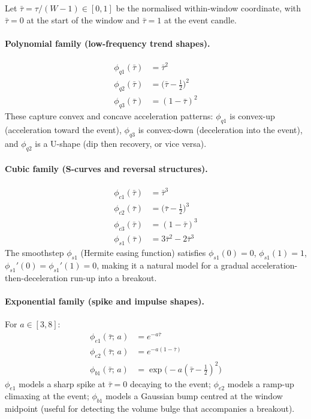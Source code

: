 \documentclass[11pt,a4paper]{article}
\theoremstyle{definition}
\theoremstyle{plain}
\begin{document}
Let $\bar{\tau} = \tau / (W - 1) \in [0, 1]$ be the normalised within-window coordinate,
with $\bar{\tau} = 0$ at the start of the window and $\bar{\tau} = 1$ at the event
candle.

\paragraph{Polynomial family (low-frequency trend shapes).}
\begin{align}
    \phi_{q1}(\bar{\tau}) &= \bar{\tau}^2
        \label{eq:phi_q1} \\
    \phi_{q2}(\bar{\tau}) &= \bigl(\bar{\tau} - \tfrac{1}{2}\bigr)^2
        \label{eq:phi_q2} \\
    \phi_{q3}(\bar{\tau}) &= (1 - \bar{\tau})^2
        \label{eq:phi_q3}
\end{align}
These capture convex and concave acceleration patterns: $\phi_{q1}$ is convex-up
(acceleration toward the event), $\phi_{q3}$ is convex-down (deceleration into the
event), and $\phi_{q2}$ is a U-shape (dip then recovery, or vice versa).

\paragraph{Cubic family (S-curves and reversal structures).}
\begin{align}
    \phi_{c1}(\bar{\tau}) &= \bar{\tau}^3
        \label{eq:phi_c1} \\
    \phi_{c2}(\bar{\tau}) &= \bigl(\bar{\tau} - \tfrac{1}{2}\bigr)^3
        \label{eq:phi_c2} \\
    \phi_{c3}(\bar{\tau}) &= (1 - \bar{\tau})^3
        \label{eq:phi_c3} \\
    \phi_{s1}(\bar{\tau}) &= 3\bar{\tau}^2 - 2\bar{\tau}^3
        \label{eq:phi_s1}
\end{align}
The smoothstep $\phi_{s1}$ (Hermite easing function) satisfies $\phi_{s1}(0) = 0$,
$\phi_{s1}(1) = 1$, $\phi_{s1}'(0) = \phi_{s1}'(1) = 0$, making it a natural model for
a gradual acceleration-then-deceleration run-up into a breakout.

\paragraph{Exponential family (spike and impulse shapes).}
For $a \in [3, 8]$:
\begin{align}
    \phi_{e1}(\bar{\tau};\, a) &= e^{-a\bar{\tau}}
        \label{eq:phi_e1} \\
    \phi_{e2}(\bar{\tau};\, a) &= e^{-a(1-\bar{\tau})}
        \label{eq:phi_e2} \\
    \phi_{b1}(\bar{\tau};\, a) &= \exp\!\bigl(-a(\bar{\tau} - \tfrac{1}{2})^2\bigr)
        \label{eq:phi_b1}
\end{align}
$\phi_{e1}$ models a sharp spike at $\bar{\tau}=0$ decaying to the event; $\phi_{e2}$
models a ramp-up climaxing at the event; $\phi_{b1}$ models a Gaussian bump centred at
the window midpoint (useful for detecting the volume bulge that accompanies a breakout).
\end{document}
